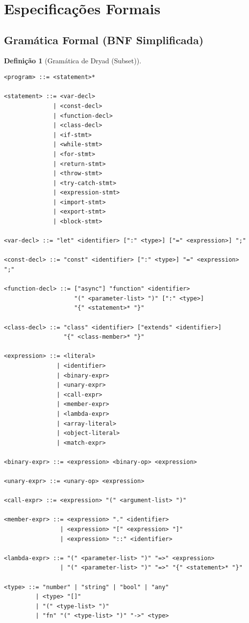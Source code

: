 \documentclass[12pt,a4paper]{article}
\theoremstyle{definition}
\newtheorem{definition}{Definição}[section]
\begin{document}
\section{Especificações Formais}

\subsection{Gramática Formal (BNF Simplificada)}

\begin{definition}[Gramática de Dryad (Subset)]
\begin{verbatim}
<program> ::= <statement>*

<statement> ::= <var-decl>
              | <const-decl>
              | <function-decl>
              | <class-decl>
              | <if-stmt>
              | <while-stmt>
              | <for-stmt>
              | <return-stmt>
              | <throw-stmt>
              | <try-catch-stmt>
              | <expression-stmt>
              | <import-stmt>
              | <export-stmt>
              | <block-stmt>

<var-decl> ::= "let" <identifier> [":" <type>] ["=" <expression>] ";"

<const-decl> ::= "const" <identifier> [":" <type>] "=" <expression> ";"

<function-decl> ::= ["async"] "function" <identifier>
                    "(" <parameter-list> ")" [":" <type>]
                    "{" <statement>* "}"

<class-decl> ::= "class" <identifier> ["extends" <identifier>]
                 "{" <class-member>* "}"

<expression> ::= <literal>
               | <identifier>
               | <binary-expr>
               | <unary-expr>
               | <call-expr>
               | <member-expr>
               | <lambda-expr>
               | <array-literal>
               | <object-literal>
               | <match-expr>

<binary-expr> ::= <expression> <binary-op> <expression>

<unary-expr> ::= <unary-op> <expression>

<call-expr> ::= <expression> "(" <argument-list> ")"

<member-expr> ::= <expression> "." <identifier>
                | <expression> "[" <expression> "]"
                | <expression> "::" <identifier>

<lambda-expr> ::= "(" <parameter-list> ")" "=>" <expression>
                | "(" <parameter-list> ")" "=>" "{" <statement>* "}"

<type> ::= "number" | "string" | "bool" | "any"
         | <type> "[]"
         | "(" <type-list> ")"
         | "fn" "(" <type-list> ")" "->" <type>
\end{verbatim}
\end{definition}
\end{document}
